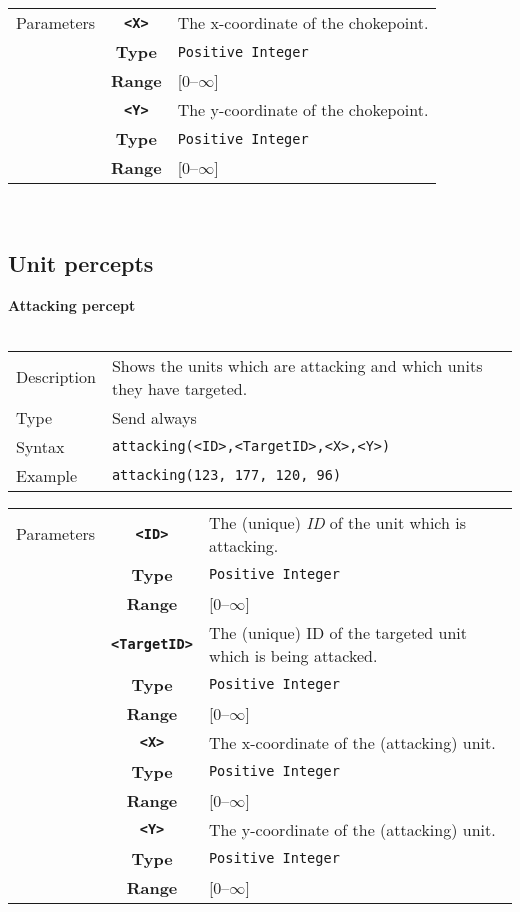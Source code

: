  \begin{tabularx}{\textwidth}{l | c | p{8cm}|}
 \cline{2-3} 
 Parameters & \textbf{\verb|<X>|} & The x-coordinate of the chokepoint.\\
            & \textbf{Type} & \verb|Positive Integer| \\
            & \textbf{Range} & [0--$\infty$] \\
            \cline{2-3} 
            & \textbf{\verb|<Y>|} & The y-coordinate of the chokepoint.\\
            & \textbf{Type} & \verb|Positive Integer| \\
            & \textbf{Range} & [0--$\infty$] \\
            \cline{2-3} 
\end{tabularx}\\

\subsection{Unit percepts}

\noindent
\textbf{Attacking percept}\\
\\
\begin{tabularx}{\textwidth}{lX}
 Description & Shows the units which are attacking and which units they have targeted. \\
 Type & Send always \\
 Syntax & \verb|attacking(<ID>,<TargetID>,<X>,<Y>)| \\
 Example & \verb|attacking(123, 177, 120, 96)| \\ 
 \end{tabularx}
 \begin{tabularx}{\textwidth}{l | c | p{8cm}|}
 \cline{2-3} 
 Parameters & \textbf{\verb|<ID>|} & The (unique) \textit{ID} of the unit which is attacking. \\
            & \textbf{Type} & \verb|Positive Integer| \\
            & \textbf{Range} & [0--$\infty$] \\
            \cline{2-3} 
            & \textbf{\verb|<TargetID>|} & The (unique) ID of the targeted unit which is being attacked. \\
            & \textbf{Type} & \verb|Positive Integer| \\
            & \textbf{Range} & [0--$\infty$] \\
            \cline{2-3} 
            & \textbf{\verb|<X>|} & The x-coordinate of the (attacking) unit.\\
            & \textbf{Type} & \verb|Positive Integer| \\
            & \textbf{Range} & [0--$\infty$] \\
            \cline{2-3} 
            & \textbf{\verb|<Y>|} & The y-coordinate of the (attacking) unit.\\
            & \textbf{Type} & \verb|Positive Integer| \\
            & \textbf{Range} & [0--$\infty$] \\
            \cline{2-3} 
\end{tabularx} 

